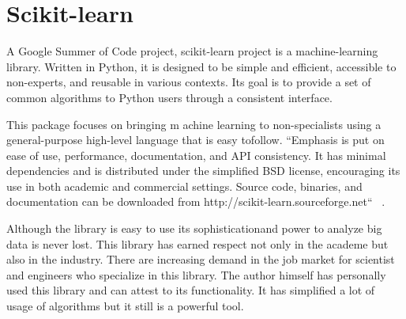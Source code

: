 \section{Scikit-learn}

A Google Summer of Code project, 
scikit-learn project is a
machine-learning library.  
Written in Python, it is designed to be
simple and efficient, accessible to 
non-experts, and reusable in
various contexts. Its goal is to provide a 
set of common algorithms to
Python users through a consistent interface.

This package focuses on bringing m
achine learning to non-specialists
using a general-purpose high-level 
language that is easy tofollow. 
``Emphasis is put on ease of use, performance, 
documentation, and API consistency. 
It has minimal dependencies and is distributed
under the simplified BSD license, 
encouraging its use in both academic
and commercial settings. Source code, 
binaries, and documentation can
be downloaded from http://scikit-learn.sourceforge.net``
~\cite{hid-sp18-506-Scikit-learn}.

	
Although the library is easy to use its 
sophisticationand power to analyze big data
is never lost. This library has earned respect 
not only in the academe but also in the
industry. There are increasing demand in the 
job market for scientist and engineers
who specialize in this library. The author 
himself has personally used this library and
can attest to its functionality. It has 
simplified a lot of usage of algorithms but 
it still is a powerful tool.
